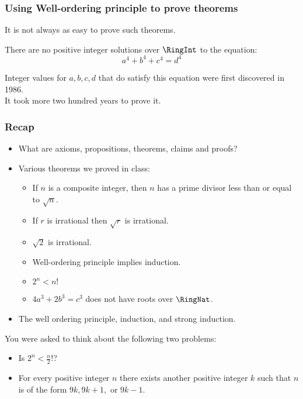  \begin{frame}[fragile]
\frametitle{Using Well-ordering principle to prove theorems}
It is not always as easy to prove such theorems.
\begin{conj}[Euler, 1769]
There are no positive integer solutions over $\RingInt$ to the
equation:
$$a^4 + b^4 + c^4 = d^4$$
\end{conj}

Integer values for $a, b, c, d$ that do satisfy this equation were first discovered in
1986. \\
It took more two hundred years to prove it.
\end{frame}

 \begin{frame}[fragile]
\frametitle{Recap}
\begin{itemize}
\item What are axioms, propositions, theorems, claims and proofs?
\item Various theorems we proved in class:


\begin{itemize}
\item If $n$ is a composite integer, then $n$ has a prime divisor less than or equal to $\sqrt{n}$.

\item If $r$ is irrational then $\sqrt{r}$ is irrational.

\item $\sqrt{2}$ is irrational.

\item Well-ordering principle implies induction.

\item $2^n < n!$

\item $4a^3+2b^3=c^3$ does not have roots over $\RingNat$.

\end{itemize}



\item The well ordering principle, induction, and strong induction.
\end{itemize}
You were asked to think about the following two problems:
\begin{itemize}
\item Is $2^n < \frac{n}{2}!$?
\item For every positive integer $n$ there exists another positive integer $k$ such that $n$ is of the form $9k, 9k+1,$ or $9k-1$.
\end{itemize}

\end{frame}

